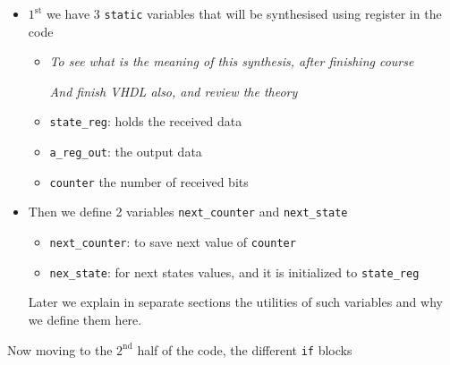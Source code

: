 \begin{itemize}

\item $\mathrm{1}^\mathrm{st}$ we have 3 \verb|static| variables that will be synthesised using register in the code

	\begin{itemize}
	\item {}  
	
	\textit{To see what is the meaning of this synthesis, after finishing course}
	
	\textit{And finish VHDL also, and review the theory}
	\end{itemize}

	\begin{itemize}

	\item \verb|state_reg|: holds the received data
	
	\item \verb|a_reg_out|: the output data
	
	\item \verb|counter| the number of received bits

	\end{itemize}

\item Then we define 2 variables \verb|next_counter| and \verb|next_state|

	\begin{itemize}
	\item \verb|next_counter|: to save next value of \verb|counter|
	
	\item \verb|nex_state|: for next states values, and it is initialized to \verb|state_reg| 
	
	\end{itemize}

Later we explain in separate sections the utilities of such variables and why we define them here.

\end{itemize}

\newpage
Now moving to the $\mathrm{2}^\mathrm{nd}$ half of the code, the different \verb|if| blocks

